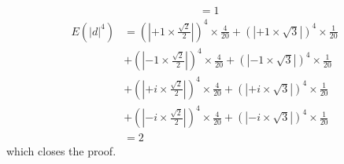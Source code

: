 \begin{Proof}
\begin{equation*}
\begin{split}
			 &= 1
		\end{split}
	  \end{equation*}
	  \begin{equation*}
		\begin{split}
		E(\left|d\right|^4) &= \left(\left|+1 \times \frac{\sqrt{2}}{2}\right|\right)^4 \times \frac{4}{20} + \left(\left|+1 \times \sqrt{3}\right|\right)^4 \times \frac{1}{20}\\
		                    &+\left(\left|-1 \times \frac{\sqrt{2}}{2}\right|\right)^4 \times \frac{4}{20}+\left(\left|-1 \times \sqrt{3}\right|\right)^4 \times \frac{1}{20}\\
		                    &+ \left(\left|+i \times \frac{\sqrt{2}}{2}\right|\right)^4 \times \frac{4}{20} + \left(\left|+i \times \sqrt{3}\right|\right)^4 \times \frac{1}{20}\\
							&+\left(\left|-i \times \frac{\sqrt{2}}{2}\right|\right)^4 \times \frac{4}{20}+\left(\left|-i \times \sqrt{3}\right|\right)^4 \times \frac{1}{20}\\ 
			 &= 2
		\end{split}
	 \end{equation*}
	 which closes the proof.
\end{Proof}

